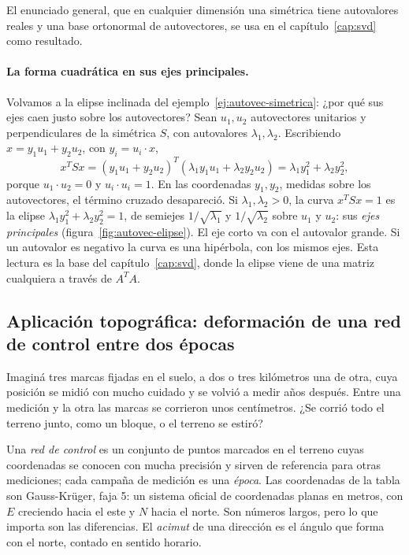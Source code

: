 El enunciado general, que en cualquier dimensión una simétrica tiene autovalores reales y una
base ortonormal de autovectores, se usa en el capítulo~\ref{cap:svd} como resultado.

\paragraph{La forma cuadrática en sus ejes principales.} Volvamos a la elipse inclinada del
ejemplo~\ref{ej:autovec-simetrica}: ¿por qué sus ejes caen justo sobre los autovectores? Sean \(u_1,u_2\) autovectores
unitarios y perpendiculares de la simétrica \(S\), con autovalores \(\lambda_1,\lambda_2\).
Escribiendo \(x=y_1u_1+y_2u_2\), con \(y_i=u_i\cdot x\),
\[
  x^TSx=(y_1u_1+y_2u_2)^T(\lambda_1y_1u_1+\lambda_2y_2u_2)=\lambda_1y_1^2+\lambda_2y_2^2,
\]
porque \(u_1\cdot u_2=0\) y \(u_i\cdot u_i=1\). En las coordenadas \(y_1,y_2\), medidas sobre
los autovectores, el término cruzado desapareció. Si \(\lambda_1,\lambda_2>0\), la curva
\(x^TSx=1\) es la elipse \(\lambda_1y_1^2+\lambda_2y_2^2=1\), de semiejes
\(1/\sqrt{\lambda_1}\) y \(1/\sqrt{\lambda_2}\) sobre \(u_1\) y \(u_2\): sus \emph{ejes
principales} (figura~\ref{fig:autovec-elipse}). El eje corto va con el autovalor grande. Si
un autovalor es negativo la curva es una hipérbola, con los mismos ejes. Esta lectura es la
base del capítulo~\ref{cap:svd}, donde la elipse viene de una matriz cualquiera a través de
\(A^TA\).

\subsection{Aplicación topográfica: deformación de una red de control entre dos épocas}\label{sec:aplicacion-deformacion}

Imaginá tres marcas fijadas en el suelo, a dos o tres kilómetros una de otra, cuya posición se
midió con mucho cuidado y se volvió a medir años después. Entre una medición y la otra las
marcas se corrieron unos centímetros. ¿Se corrió todo el terreno junto, como un bloque, o el
terreno se estiró?

\begin{idea}
Una \emph{red de control} es un conjunto de puntos marcados en el terreno cuyas coordenadas se
conocen con mucha precisión y sirven de referencia para otras mediciones; cada campaña de
medición es una \emph{época}. Las coordenadas de la tabla son Gauss-Krüger, faja 5: un sistema
oficial de coordenadas planas en metros, con \(E\) creciendo hacia el este y \(N\) hacia el
norte. Son números largos, pero lo que importa son las diferencias. El \emph{acimut} de una
dirección es el ángulo que forma con el norte, contado en sentido horario.
\end{idea}

